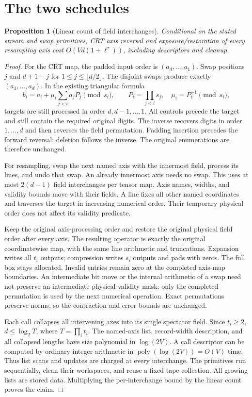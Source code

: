 \documentclass[11pt]{article}
\newtheorem{proposition}{Proposition}
\begin{document}
\section{The two schedules}
\begin{proposition}[Linear count of field interchanges]
Conditional on the stated stream and swap primitives, CRT axis reversal and
exposure/restoration of every resampling axis cost
$O(Vd(1+\ell^\tau))$, including descriptors and cleanup.
\end{proposition}
\begin{proof}
For the CRT map, the padded input order is $(a_d,\ldots,a_1)$.
Swap positions $j$ and $d+1-j$ for $1\le j\le\lfloor d/2\rfloor$.
The disjoint swaps produce exactly $(a_1,\ldots,a_d)$. In the existing
triangular formula
\[
 b_i=a_i+\mu_i\sum_{j<i}a_jP_j\pmod{s_i},\qquad
 P_i=\prod_{j<i}s_j,\quad \mu_i=P_i^{-1}\pmod{s_i},
\]
targets are still processed in order $d,d-1,\ldots,1$. All controls precede
the target and still contain the required original digits. The inverse
recovers digits in order $1,\ldots,d$ and then reverses the field permutation.
Padding insertion precedes the forward reversal; deletion follows the inverse.
The original enumerations are therefore unchanged.

For resampling, swap the next named axis with the innermost field, process
its lines, and undo that swap. An already innermost axis needs no swap.
This uses at most $2(d-1)$ field interchanges per tensor map. Axis names,
widths, and validity bounds move with their fields. A line fixes all other
named coordinates and traverses the target in increasing numerical order.
Their temporary physical order does not affect its validity predicate.

Keep the original axis-processing order and restore the original physical
field order after every axis. The resulting operator is exactly the original
coordinatewise map, with the same line arithmetic and truncations. Expansion
writes all $t_i$ outputs; compression writes $s_i$ outputs and pads with zeros.
The full box stays allocated. Invalid entries remain zero at the completed
axis-map boundaries. An intermediate bit move or the internal arithmetic of a
swap need not preserve an intermediate physical validity mask: only the
completed permutation is used by the next numerical operation. Exact
permutations preserve norms, so the contraction and error bounds are unchanged.

Each call collapses all intervening axes into its single spectator field.
Since $t_i\ge2$, $d\le\log_2 T$, where $T=\prod_i t_i$. The named-axis
list, record-width description, and all collapsed lengths have size polynomial
in $\log(2V)$. A call descriptor can be computed by ordinary integer arithmetic
in $\operatorname{poly}(\log(2V))=O(V)$ time. Thus list scans and updates are
charged at every interchange. The primitives run sequentially, clean their
workspaces, and reuse a fixed tape collection. All growing lists are stored
data. Multiplying the per-interchange bound by the linear count proves the claim.
\end{proof}
\end{document}
